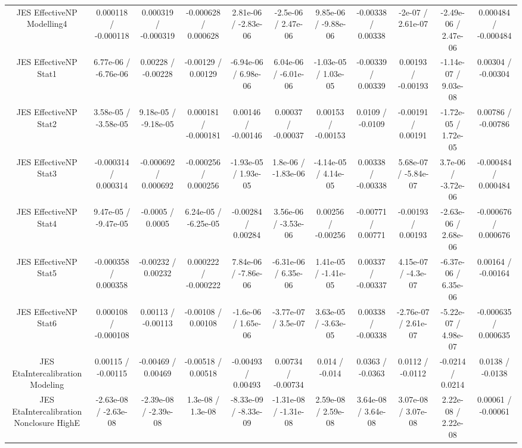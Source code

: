 \begin{table}[htbp]
\begin{center}
\begin{tabular}{|c|c|c|c|c|c|c|c|c|c|c|}
  JES EffectiveNP Modelling4 & 0.000118 / -0.000118 & 0.000319 / -0.000319 & -0.000628 / 0.000628 & 2.81e-06 / -2.83e-06 & -2.5e-06 / 2.47e-06 & 9.85e-06 / -9.88e-06 & -0.00338 / 0.00338 & -2e-07 / 2.61e-07 & -2.49e-06 / 2.47e-06 & 0.000484 / -0.000484 \\ 
  JES EffectiveNP Stat1 & 6.77e-06 / -6.76e-06 & 0.00228 / -0.00228 & -0.00129 / 0.00129 & -6.94e-06 / 6.98e-06 & 6.04e-06 / -6.01e-06 & -1.03e-05 / 1.03e-05 & -0.00339 / 0.00339 & 0.00193 / -0.00193 & -1.14e-07 / 9.03e-08 & 0.00304 / -0.00304 \\ 
  JES EffectiveNP Stat2 & 3.58e-05 / -3.58e-05 & 9.18e-05 / -9.18e-05 & 0.000181 / -0.000181 & 0.00146 / -0.00146 & 0.00037 / -0.00037 & 0.00153 / -0.00153 & 0.0109 / -0.0109 & -0.00191 / 0.00191 & -1.72e-05 / 1.72e-05 & 0.00786 / -0.00786 \\ 
  JES EffectiveNP Stat3 & -0.000314 / 0.000314 & -0.000692 / 0.000692 & -0.000256 / 0.000256 & -1.93e-05 / 1.93e-05 & 1.8e-06 / -1.83e-06 & -4.14e-05 / 4.14e-05 & 0.00338 / -0.00338 & 5.68e-07 / -5.84e-07 & 3.7e-06 / -3.72e-06 & -0.000484 / 0.000484 \\ 
  JES EffectiveNP Stat4 & 9.47e-05 / -9.47e-05 & -0.0005 / 0.0005 & 6.24e-05 / -6.25e-05 & -0.00284 / 0.00284 & 3.56e-06 / -3.53e-06 & 0.00256 / -0.00256 & -0.00771 / 0.00771 & -0.00193 / 0.00193 & -2.63e-06 / 2.68e-06 & -0.000676 / 0.000676 \\ 
  JES EffectiveNP Stat5 & -0.000358 / 0.000358 & -0.00232 / 0.00232 & 0.000222 / -0.000222 & 7.84e-06 / -7.86e-06 & -6.31e-06 / 6.35e-06 & 1.41e-05 / -1.41e-05 & 0.00337 / -0.00337 & 4.15e-07 / -4.3e-07 & -6.37e-06 / 6.35e-06 & 0.00164 / -0.00164 \\ 
  JES EffectiveNP Stat6 & 0.000108 / -0.000108 & 0.00113 / -0.00113 & -0.00108 / 0.00108 & -1.6e-06 / 1.65e-06 & -3.77e-07 / 3.5e-07 & 3.63e-05 / -3.63e-05 & 0.00338 / -0.00338 & -2.76e-07 / 2.61e-07 & -5.22e-07 / 4.98e-07 & -0.000635 / 0.000635 \\ 
  JES EtaIntercalibration Modeling & 0.00115 / -0.00115 & -0.00469 / 0.00469 & -0.00518 / 0.00518 & -0.00493 / 0.00493 & 0.00734 / -0.00734 & 0.014 / -0.014 & 0.0363 / -0.0363 & 0.0112 / -0.0112 & -0.0214 / 0.0214 & 0.0138 / -0.0138 \\ 
  JES EtaIntercalibration Nonclosure HighE & -2.63e-08 / -2.63e-08 & -2.39e-08 / -2.39e-08 & 1.3e-08 / 1.3e-08 & -8.33e-09 / -8.33e-09 & -1.31e-08 / -1.31e-08 & 2.59e-08 / 2.59e-08 & 3.64e-08 / 3.64e-08 & 3.07e-08 / 3.07e-08 & 2.22e-08 / 2.22e-08 & 0.00061 / -0.00061 \\ 

\end{tabular}
\end{center}
\end{table}
